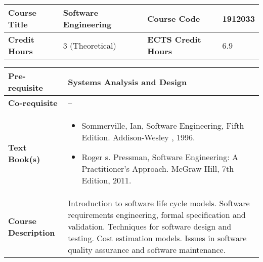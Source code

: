 \documentclass[12pt]{article}
\begin{document}
\begin{minipage}{\textwidth}
\begin{tabularx}{\textwidth}{|l|X|l|X|}
\hline
\textbf{Course Title}       &  Software Engineering  & \textbf{Course Code}       & 1912033  \\ \hline
\textbf{Credit Hours}       &  3 (Theoretical) & \textbf{ECTS Credit Hours}       &  6.9 \\ \hline
\end{tabularx}

\begin{tabularx}{\textwidth}{|l|X|}
\hline
\textbf{Pre-requisite}      &  Systems Analysis and Design \\ \hline
\textbf{Co-requisite}       &  -- \\ \hline
\textbf{Text Book(s)}      & \begin{minipage}{.70\textwidth}
					\begin{itemize} \itemsep-0.4em
						\vspace{3mm}
						\item Sommerville, Ian, Software Engineering, Fifth Edition. Addison-Wesley , 1996.
						\item Roger s. Pressman, Software Engineering: A Practitioner's Approach. McGraw Hill, 7th Edition, 2011.
						\vspace{3mm}
					\end{itemize}
				\end{minipage}  \\ \hline
\textbf{Course Description} & \begin{minipage}{.70\textwidth}
					\vspace{3mm}
					Introduction to software life cycle models.
					Software requirements engineering, formal specification and validation. Techniques for software
					design and testing. Cost estimation models. Issues in software quality assurance and software
					maintenance.

					\vspace{3mm}
					\end{minipage} \\ \hline
\end{tabularx}
\end{minipage}


\bigskip
\bigskip
\end{document}
